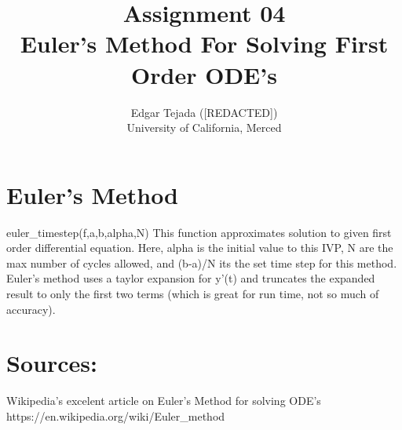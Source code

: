 \documentclass [12pt]{article}
\title{Assignment 04 \\\medskip Euler's Method For Solving First Order ODE's}
\author{Edgar Tejada ([REDACTED])\\University of California, Merced}
\begin{document}
\maketitle

\newpage
\section{Euler's Method}
\indent euler_timestep(f,a,b,alpha,N)
\indent \indent This function approximates solution to given first order differential equation. Here, alpha is the initial value to this IVP, N are the max number of cycles allowed, and (b-a)/N its the set time step for this method. Euler's method uses a taylor expansion for y'(t) and truncates the expanded result to only the first two terms (which is great for run time, not so much of accuracy).



\newpage
\section{Sources:}
Wikipedia's excelent article on Euler's Method for solving ODE's
\indent https://en.wikipedia.org/wiki/Euler_method


\nocite{*} 
\printbibliography
\end{document}
